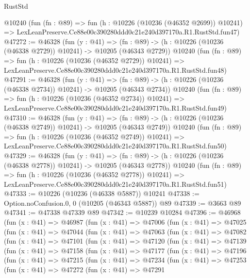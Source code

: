 \begin{lexlean}{RustStd}
\begin{coremodule}
    @10240
    (fun (fn : @89) =>
    fun (h : @10226 (@10236 (@46352 @2699)) @10241) =>
    LexLeanPreserve.Ce88e00c390280ddd0c21e240d397170a.R1.RustStd.fun47)
@47272 := @46328
    (fun (y : @41) =>
    (fn : @89) -> (h : @10226 (@10236 (@46338 @2729)) @10241) -> @10205 (@46343 @2729))
    @10240
    (fun (fn : @89) =>
    fun (h : @10226 (@10236 (@46352 @2729)) @10241) =>
    LexLeanPreserve.Ce88e00c390280ddd0c21e240d397170a.R1.RustStd.fun48)
@47291 := @46328
    (fun (y : @41) =>
    (fn : @89) -> (h : @10226 (@10236 (@46338 @2734)) @10241) -> @10205 (@46343 @2734))
    @10240
    (fun (fn : @89) =>
    fun (h : @10226 (@10236 (@46352 @2734)) @10241) =>
    LexLeanPreserve.Ce88e00c390280ddd0c21e240d397170a.R1.RustStd.fun49)
@47310 := @46328
    (fun (y : @41) =>
    (fn : @89) -> (h : @10226 (@10236 (@46338 @2749)) @10241) -> @10205 (@46343 @2749))
    @10240
    (fun (fn : @89) =>
    fun (h : @10226 (@10236 (@46352 @2749)) @10241) =>
    LexLeanPreserve.Ce88e00c390280ddd0c21e240d397170a.R1.RustStd.fun50)
@47329 := @46328
    (fun (y : @41) =>
    (fn : @89) -> (h : @10226 (@10236 (@46338 @2778)) @10241) -> @10205 (@46343 @2778))
    @10240
    (fun (fn : @89) =>
    fun (h : @10226 (@10236 (@46352 @2778)) @10241) =>
    LexLeanPreserve.Ce88e00c390280ddd0c21e240d397170a.R1.RustStd.fun51)
@47333 := @10226 (@10236 (@46338 @5887)) @10241
@47338 := Option.noConfusion.{0, 0} (@10205 (@46343 @5887)) @89
@47339 := @3663 @89
@47341 := @47338 @47339 @89
@47342 := @10239 @10284
@47396 := @46968
    (fun (x : @41) =>
    @46987
      (fun (x : @41) =>
      @47006
        (fun (x : @41) =>
        @47025
          (fun (x : @41) =>
          @47044
            (fun (x : @41) =>
            @47063
              (fun (x : @41) =>
              @47082
                (fun (x : @41) =>
                @47101
                  (fun (x : @41) =>
                  @47120
                    (fun (x : @41) =>
                    @47139
                      (fun (x : @41) =>
                      @47158
                        (fun (x : @41) =>
                        @47177
                          (fun (x : @41) =>
                          @47196
                            (fun (x : @41) =>
                            @47215
                              (fun (x : @41) =>
                              @47234
                                (fun (x : @41) =>
                                @47253
                                  (fun (x : @41) =>
                                  @47272
                                    (fun (x : @41) =>
                                    @47291

\end{coremodule}
\end{lexlean}
